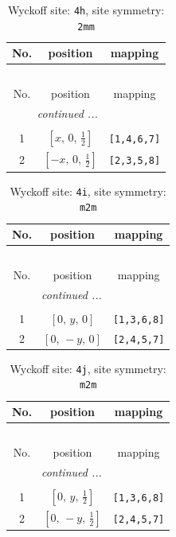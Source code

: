 \documentclass[fleqn,8pt]{jsarticle}
\begin{document}
\begin{longtable}{ccc}
\caption{Wyckoff site: {\tt 4h}, site symmetry: {\tt 2mm}}
 \\
 \hline \hline
No. & position & mapping \\ \hline \endfirsthead

\multicolumn{2}{l}{\tablename\ \thetable{}} \\
 \hline \hline
No. & position & mapping \\ \hline \endhead

 \hline \hline
\multicolumn{2}{r}{\footnotesize\it continued ...} \\ \endfoot

 \hline \hline
\multicolumn{2}{r}{} \\ \endlastfoot

1 & $\left[ x,\, 0,\, \frac{1}{2} \right]$ & {\tt [1,4,6,7]} \\ \hline
2 & $\left[ - x,\, 0,\, \frac{1}{2} \right]$ & {\tt [2,3,5,8]} \\
\end{longtable}
\renewcommand{\arraystretch}{1.2}
\begin{longtable}{ccc}
\caption{Wyckoff site: {\tt 4i}, site symmetry: {\tt m2m}}
 \\
 \hline \hline
No. & position & mapping \\ \hline \endfirsthead

\multicolumn{2}{l}{\tablename\ \thetable{}} \\
 \hline \hline
No. & position & mapping \\ \hline \endhead

 \hline \hline
\multicolumn{2}{r}{\footnotesize\it continued ...} \\ \endfoot

 \hline \hline
\multicolumn{2}{r}{} \\ \endlastfoot

1 & $\left[ 0,\, y,\, 0 \right]$ & {\tt [1,3,6,8]} \\ \hline
2 & $\left[ 0,\, - y,\, 0 \right]$ & {\tt [2,4,5,7]} \\
\end{longtable}
\renewcommand{\arraystretch}{1.2}
\begin{longtable}{ccc}
\caption{Wyckoff site: {\tt 4j}, site symmetry: {\tt m2m}}
 \\
 \hline \hline
No. & position & mapping \\ \hline \endfirsthead

\multicolumn{2}{l}{\tablename\ \thetable{}} \\
 \hline \hline
No. & position & mapping \\ \hline \endhead

 \hline \hline
\multicolumn{2}{r}{\footnotesize\it continued ...} \\ \endfoot

 \hline \hline
\multicolumn{2}{r}{} \\ \endlastfoot

1 & $\left[ 0,\, y,\, \frac{1}{2} \right]$ & {\tt [1,3,6,8]} \\ \hline
2 & $\left[ 0,\, - y,\, \frac{1}{2} \right]$ & {\tt [2,4,5,7]} \\
\end{longtable}
\end{document}

